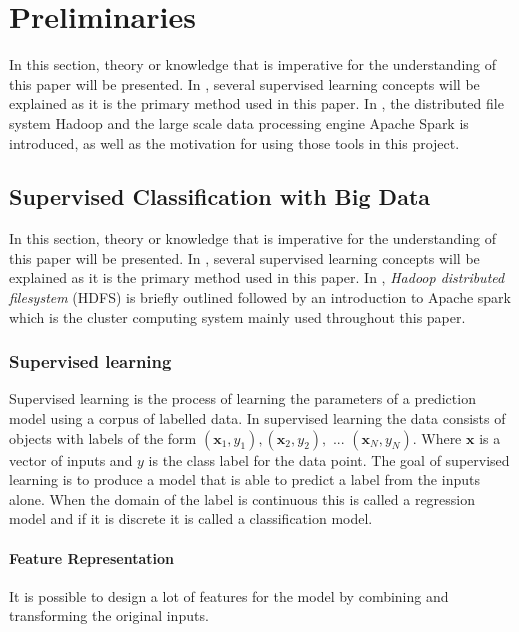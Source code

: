 \section{Preliminaries}\label{sec:prelim}
In this section, theory or knowledge that is imperative for the understanding of this paper will be presented. In , several supervised learning concepts will be explained as it is the primary method used in this paper. In , the distributed file system Hadoop and the large scale data processing engine Apache Spark is introduced, as well as the motivation for using those tools in this project.

\subsection{Supervised Classification with Big Data}
\label{sec:supervisedclassification}

In this section, theory or knowledge that is imperative for the understanding of this paper will be presented. In , several supervised learning concepts will be explained as it is the primary method used in this paper. In , \emph{Hadoop distributed filesystem} (HDFS) is briefly outlined followed by an introduction to Apache spark which is the cluster computing system mainly used throughout this paper.

\subsubsection{Supervised learning}
Supervised learning is the process of learning the parameters of a prediction model using a corpus of labelled data.
In supervised learning the data consists of objects with labels of the form 
$(\textbf{x}_1,y_1),(\textbf{x}_2,y_2), \text{ ... } (\textbf{x}_N,y_N)$.
Where $\textbf{x}$ is a vector of inputs and $y$ is the class label for the data point.
The goal of supervised learning is to produce a model that is able to predict a label from the inputs alone.
When the domain of the label is continuous this is called a regression model and if it is discrete it is called a classification model.

\paragraph{Feature Representation}\label{sec:phi}
It is possible to design a lot of features for the model by combining and transforming the original inputs.

